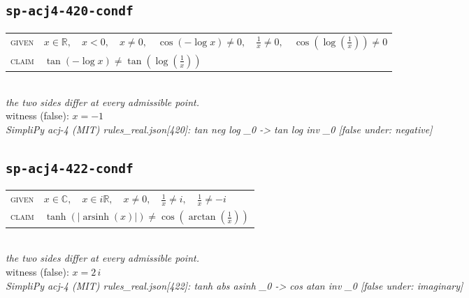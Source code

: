 \documentclass[11pt]{article}
\begin{document}
\subsection*{\texttt{sp-acj4-420-condf}}
\begin{tabular}{@{}l@{\quad}l@{}}
\textsc{given} & $x \in \mathbb{R},\quad x < 0,\quad x \neq 0,\quad \cos\left(-\log x\right) \neq 0,\quad \frac{1}{x} \neq 0,\quad \cos\left(\log\left(\frac{1}{x}\right)\right) \neq 0$ \\[4pt]
\textsc{claim} & $\displaystyle \tan\left(-\log x\right) \neq \tan\left(\log\left(\frac{1}{x}\right)\right)$ \\
\end{tabular}\\[2pt]
{\small\emph{the two sides differ at every admissible point.}}\\
{\footnotesize\color{gray}witness (false): $x = -1$}\\
\emph{SimpliPy acj-4 (MIT) rules\_real.json[420]: tan neg log \_0  ->  tan log inv \_0  [false under: negative]}\\

\subsection*{\texttt{sp-acj4-422-condf}}
\begin{tabular}{@{}l@{\quad}l@{}}
\textsc{given} & $x \in \mathbb{C},\quad x \in i\mathbb{R},\quad x \neq 0,\quad \frac{1}{x} \neq i,\quad \frac{1}{x} \neq -i$ \\[4pt]
\textsc{claim} & $\displaystyle \tanh\left(\left|\operatorname{arsinh}\left(x\right)\right|\right) \neq \cos\left(\arctan\left(\frac{1}{x}\right)\right)$ \\
\end{tabular}\\[2pt]
{\small\emph{the two sides differ at every admissible point.}}\\
{\footnotesize\color{gray}witness (false): $x = 2 \, i$}\\
\emph{SimpliPy acj-4 (MIT) rules\_real.json[422]: tanh abs asinh \_0  ->  cos atan inv \_0  [false under: imaginary]}\\
\end{document}
